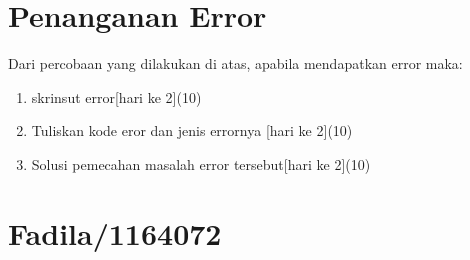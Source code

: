 \section{Penanganan Error}
Dari percobaan yang dilakukan di atas, apabila mendapatkan error maka:

\begin{enumerate}
	\item
	skrinsut error[hari ke 2](10)
	\item
Tuliskan kode eror dan jenis errornya [hari ke 2](10)
	\item
Solusi pemecahan masalah error tersebut[hari ke 2](10)

\end{enumerate}

\section{Fadila/1164072}

